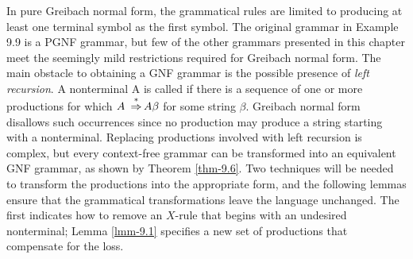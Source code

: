 In pure Greibach normal form, the grammatical rules are limited to producing at
least one terminal symbol as the first symbol. The original grammar in Example
9.9 is a PGNF grammar, but few of the other grammars presented in this chapter
meet the seemingly mild restrictions required for Greibach normal form. The main
obstacle to obtaining a GNF grammar is the possible presence of \emph{left
recursion}. A nonterminal A is called \emph{} if there is
a sequence of one or more productions for which $A\ \operatorname{\overset{*}{\Rightarrow}} A\beta$ for some
string $\beta$. Greibach normal form disallows such occurrences since no
production may produce a string starting with a nonterminal. Replacing
productions involved with left recursion is complex, but every context-free
grammar can be transformed into an equivalent GNF grammar, as shown by Theorem
\ref{thm-9.6}. Two techniques will be needed to transform the productions into the
appropriate form, and the following lemmas ensure that the grammatical
transformations leave the language unchanged. The first indicates how to remove
an $X$-rule that begins with an undesired nonterminal; Lemma \ref{lmm-9.1} specifies a new
set of productions that compensate for the loss.

